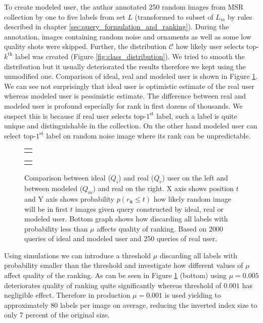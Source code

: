 To create modeled user, the author annotated 250 random images from MSR collection by one to five labels from set $L$ (transformed to subset of $L_m$ by rules described in chapter \ref{sec:query_formulation_and_ranking}). During the annotation, images containing random noise and ornaments as well as some low quality shots were skipped. Further, the distribution $\mathcal{C}$ how likely user selects top-$k^{\mathrm{th}}$ label was created (Figure \ref{fig:class_distribution}). We tried to smooth the distribution but it usually deteriorated the results therefore we kept using the unmodified one. Comparison of ideal, real and modeled user is shown in Figure \ref{fig:simulation_keyword}. We can see not surprisingly that ideal user is optimistic estimate of the real user whereas modeled user is pessimistic estimate. The difference between real and modeled user is profound especially for rank in first dozens of thousands. We suspect this is because if real user selects top-$1^{\mathrm{st}}$ label, such a label is quite unique and distinguishable in the collection. On the other hand modeled user can select top-$1^{\mathrm{st}}$ label on random noise image where its rank can be unpredictable.

\begin{figure}
	\centering
	
	\begin{tabular}{@{}c@{}}
		\subfloat{
			
		}
	\end{tabular}
	\begin{tabular}{@{}c@{}}
		\subfloat{
			
		}
	\end{tabular}
	
	
	\caption[Comparison between ideal, real and modeled user]{Comparison between ideal ($Q_i$) and real ($Q_r$) user on the left and between modeled ($Q_m$) and real on the right. X axis shows position $t$ and Y axis shows probability $p(r_{\bm{x}}\leq t)$ how likely random image will be in first $t$ images given query constructed by ideal, real or modeled user. Bottom graph shows how discarding all labels with probability less than $\mu$ affects quality of ranking. Based on 2000 queries of ideal and modeled user and 250 queries of real user.}
	\label{fig:simulation_keyword}
\end{figure}

Using simulations we can introduce a threshold $\mu$ discarding all labels with probability smaller than the threshold and investigate how different values of $\mu$ affect quality of the ranking. As can be seen in Figure \ref{fig:simulation_keyword} (bottom) using $\mu=0.005$ deteriorates quality of ranking quite significantly whereas threshold of $0.001$ has negligible effect. Therefore in production $\mu = 0.001$ is used yielding to approximately 80 labels per image on average, reducing the inverted index size to only 7 percent of the original size. 


